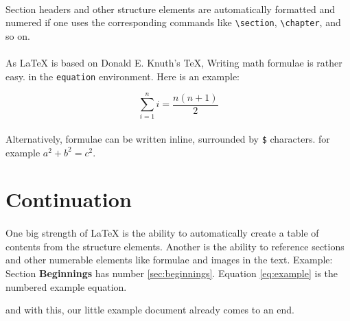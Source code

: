 \documentclass{article}
\begin{document}
\paragraph{} Section headers and other structure elements are automatically formatted and numered
if one uses the corresponding commands like \verb|\section|, \verb|\chapter|, and
so on.


\paragraph{} As {\LaTeX} is based on Donald E. Knuth's {\TeX},
Writing math formulae is rather easy. in the \verb|equation| environment.
Here is an example:


\begin{equation}
\label{eq:example}
\sum_{i=1}^{n}i = \frac{n(n+1)}{2}
\end{equation}

\paragraph{} Alternatively, formulae can be written inline, surrounded
by \verb|$| characters. for example $a^2 + b^2 = c^2$.

\section{Continuation}

\paragraph{}One big strength of {\LaTeX} is the ability to automatically create a table of contents from the
structure elements. Another is the ability to reference sections and other numerable elements like formulae
and images in the text. Example: Section \textbf{Beginnings} has number \ref{sec:beginnings}.
Equation \ref{eq:example} is the numbered example equation.





and with this, our little example document already comes to an end.
\end{document}
